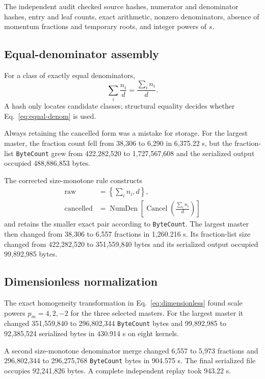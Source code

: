 \documentclass[11pt]{article}
\newcommand{\code}[1]{\texttt{#1}}
\begin{document}
The independent audit checked source hashes, numerator and denominator hashes,
entry and leaf counts, exact arithmetic, nonzero denominators, absence of
momentum fractions and temporary roots, and integer powers of $s$.

\subsection{Equal-denominator assembly}

For a class of exactly equal denominators,
\begin{equation}
  \sum_i\frac{n_i}{d}=\frac{\sum_i n_i}{d}.
  \label{eq:equal-denom}
\end{equation}
A hash only locates candidate classes; structural equality decides whether
Eq.~\eqref{eq:equal-denom} is used.

Always retaining the cancelled form was a mistake for storage.  For the
largest master, the fraction count fell from 38,306 to 6,290 in 6,375.22 s,
but the fraction-list \code{ByteCount} grew from 422,282,520 to
1,727,567,608 and the serialized output occupied 488,886,853 bytes.

The corrected size-monotone rule constructs
\begin{align}
  \text{raw}&=\left\{\sum_i n_i,d\right\},\\
  \text{cancelled}&=\operatorname{NumDen}
  \!\left[\operatorname{Cancel}\!\left(\frac{\sum_i n_i}{d}\right)\right]
\end{align}
and retains the smaller exact pair according to \code{ByteCount}.  The largest
master then changed from 38,306 to 6,557 fractions in 1,260.216 s.  Its
fraction-list size changed from 422,282,520 to 351,559,840 bytes and its
serialized output occupied 99,892,985 bytes.

\subsection{Dimensionless normalization}

The exact homogeneity transformation in Eq.~\eqref{eq:dimensionless} found
scale powers $p_m=4,2,-2$ for the three selected masters.  For the largest
master it changed 351,559,840 to 296,802,344 \code{ByteCount} bytes and
99,892,985 to 92,385,524 serialized bytes in 430.914 s on eight kernels.

A second size-monotone denominator merge changed 6,557 to 5,973 fractions and
296,802,344 to 296,275,768 \code{ByteCount} bytes in 904.575 s.  The final
serialized file occupies 92,241,826 bytes.  A complete independent replay took
943.22 s.
\end{document}
